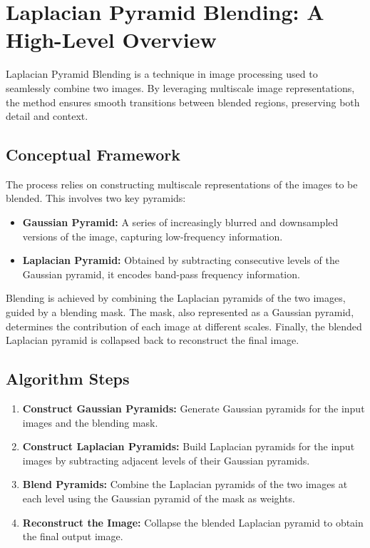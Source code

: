 \section*{Laplacian Pyramid Blending: A High-Level Overview}
Laplacian Pyramid Blending is a technique in image processing used to seamlessly combine two images. By leveraging multiscale image representations, the method ensures smooth transitions between blended regions, preserving both detail and context.

\subsection*{Conceptual Framework}
The process relies on constructing multiscale representations of the images to be blended. This involves two key pyramids:

\begin{itemize}
    \item \textbf{Gaussian Pyramid:} A series of increasingly blurred and downsampled versions of the image, capturing low-frequency information.
    \item \textbf{Laplacian Pyramid:} Obtained by subtracting consecutive levels of the Gaussian pyramid, it encodes band-pass frequency information.
\end{itemize}

Blending is achieved by combining the Laplacian pyramids of the two images, guided by a blending mask. The mask, also represented as a Gaussian pyramid, determines the contribution of each image at different scales. Finally, the blended Laplacian pyramid is collapsed back to reconstruct the final image.

\subsection*{Algorithm Steps}
\begin{enumerate}
    \item \textbf{Construct Gaussian Pyramids:} Generate Gaussian pyramids for the input images and the blending mask.
    \item \textbf{Construct Laplacian Pyramids:} Build Laplacian pyramids for the input images by subtracting adjacent levels of their Gaussian pyramids.
    \item \textbf{Blend Pyramids:} Combine the Laplacian pyramids of the two images at each level using the Gaussian pyramid of the mask as weights.
    \item \textbf{Reconstruct the Image:} Collapse the blended Laplacian pyramid to obtain the final output image.
\end{enumerate}

